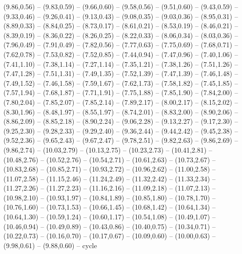\expandafter\def\csname geo:gebiet:heute-HUN\endcsname{
  (9.86,0.56) -- (9.83,0.59) -- (9.66,0.60) -- (9.58,0.56) -- (9.51,0.60) -- (9.43,0.59) -- (9.33,0.46) -- (9.26,0.41) -- (9.13,0.43) -- (9.08,0.35) -- (9.03,0.36) -- (8.95,0.31) -- (8.89,0.33) -- (8.84,0.25) -- (8.73,0.17) -- (8.61,0.21) -- (8.53,0.19) -- (8.46,0.21) -- (8.39,0.19) -- (8.36,0.22) -- (8.26,0.25) -- (8.22,0.33) -- (8.06,0.34) -- (8.03,0.36) -- (7.96,0.49) -- (7.91,0.49) -- (7.82,0.56) -- (7.77,0.63) -- (7.75,0.69) -- (7.68,0.71) -- (7.62,0.78) -- (7.53,0.82) -- (7.52,0.85) -- (7.44,0.94) -- (7.47,0.96) -- (7.40,1.06) -- (7.41,1.10) -- (7.38,1.14) -- (7.27,1.14) -- (7.35,1.21) -- (7.38,1.26) -- (7.51,1.26) -- (7.47,1.28) -- (7.51,1.31) -- (7.49,1.35) -- (7.52,1.39) -- (7.47,1.39) -- (7.46,1.48) -- (7.49,1.52) -- (7.46,1.58) -- (7.59,1.67) -- (7.62,1.73) -- (7.58,1.82) -- (7.45,1.85) -- (7.57,1.94) -- (7.68,1.87) -- (7.71,1.91) -- (7.75,1.88) -- (7.85,1.90) -- (7.84,2.00) -- (7.80,2.04) -- (7.85,2.07) -- (7.85,2.14) -- (7.89,2.17) -- (8.00,2.17) -- (8.15,2.02) -- (8.30,1.96) -- (8.48,1.97) -- (8.55,1.97) -- (8.74,2.01) -- (8.83,2.00) -- (8.90,2.06) -- (8.86,2.09) -- (8.85,2.18) -- (8.90,2.24) -- (9.06,2.28) -- (9.13,2.27) -- (9.17,2.30) -- (9.25,2.30) -- (9.28,2.33) -- (9.29,2.40) -- (9.36,2.44) -- (9.44,2.42) -- (9.45,2.38) -- (9.52,2.36) -- (9.65,2.43) -- (9.67,2.47) -- (9.78,2.51) -- (9.82,2.63) -- (9.86,2.69) -- (9.86,2.74) -- (10.03,2.79) -- (10.13,2.75) -- (10.23,2.73) -- (10.41,2.81) -- (10.48,2.76) -- (10.52,2.76) -- (10.54,2.71) -- (10.61,2.63) -- (10.73,2.67) -- (10.83,2.68) -- (10.85,2.71) -- (10.93,2.72) -- (10.96,2.62) -- (11.00,2.58) -- (11.07,2.58) -- (11.15,2.46) -- (11.24,2.49) -- (11.32,2.42) -- (11.33,2.34) -- (11.27,2.26) -- (11.27,2.23) -- (11.16,2.16) -- (11.09,2.18) -- (11.07,2.13) -- (10.98,2.10) -- (10.93,1.97) -- (10.84,1.89) -- (10.85,1.80) -- (10.78,1.70) -- (10.76,1.60) -- (10.73,1.53) -- (10.66,1.45) -- (10.68,1.42) -- (10.64,1.34) -- (10.64,1.30) -- (10.59,1.24) -- (10.60,1.17) -- (10.54,1.08) -- (10.49,1.07) -- (10.46,0.94) -- (10.49,0.89) -- (10.43,0.86) -- (10.40,0.75) -- (10.34,0.71) -- (10.22,0.73) -- (10.16,0.70) -- (10.17,0.67) -- (10.09,0.60) -- (10.00,0.63) -- (9.98,0.61) -- (9.88,0.60) -- cycle}
